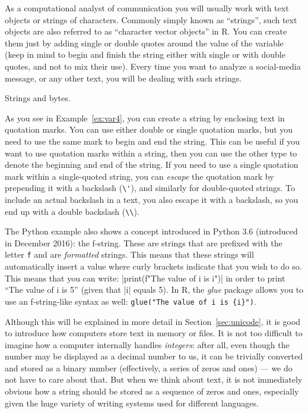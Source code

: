 As a computational analyst of communication you will usually work with
text objects or strings of characters. Commonly simply known as ``strings'',
such text objects are also referred to as ``character vector objects'' in R.
You can create them just by adding single or double quotes around the value of the variable (keep in mind to begin and finish the string either with single or with double quotes, and not to mix their use). Every time you want to analyze a social-media message, or any other text, you will be dealing with such strings. 

\begin{ccsexample}
  \caption{Strings and bytes.}\label{ex:var4}
 \end{ccsexample}

As you see in Example~\ref{ex:var4}, you can create a string by enclosing  text in quotation
marks. You can use either double or single quotation marks, but you
need to use the same mark to begin and end the string. This can be
useful if you want to use quotation marks within a string, then you can
use the other type to denote the beginning and end of the string.
If you need to use a single quotation mark within a single-quoted string,
you can \emph{escape} the quotation mark by prepending it with a backslash (\verb|\'|),
and similarly for double-quoted strings.
To include an actual backslash in a text, you also escape it with a backslash,
so you end up with a double backslash (\verb|\\|). 

The Python example also shows a concept introduced in Python 3.6 (introduced in December 2016):
the f-string. These are strings that are prefixed with the letter \texttt{f} and are \emph{formatted} strings. This means that these strings will automatically insert a value where curly brackets indicate that you wish to do so. This means that you can write: |print(f"The value of i is {i}")| in order to print ``The value of i is 5'' (given that |i| equals 5).
In R, the \emph{glue} package allows you to use an f-string-like syntax as well: \texttt{glue("The value of i is \{i\}")}.

Although this will be explained in more detail in Section~\ref{sec:unicode},
it is good to introduce how computers store text in memory or files. 
It is not too difficult to imagine how a computer internally
handles \emph{integers}: after all, even though the number may be displayed
as a decimal number to us, it can be trivially converted and stored
as a binary number (effectively, a series of zeros and ones)
--- we do not have to care about that.
But when we think about text, it is not
immediately obvious how a string should be stored as a sequence of
zeros and ones, especially given the huge variety of writing systems used for different languages. 

